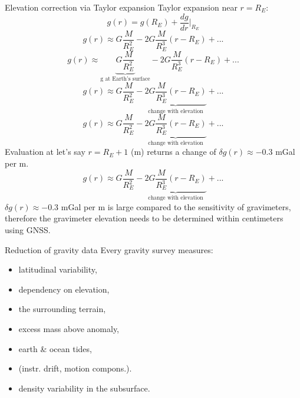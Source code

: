 \begin{frame}
  \begin{PointSix}{Elevation correction via Taylor expansion}
    Taylor expansion near $r=R_E$:
    {
      $$
        g(r) = g(R_E) + \frac{dg}{dr}|_{R_E}
      $$
    }
    {
      $$
        g(r) \approx G\frac{M}{R_E^2} - 2G\frac{M}{R_E^3}(r-R_E) + ...
      $$
    }
    {
      $$
        g(r) \approx \underbrace{G\frac{M}{R_E^2}}_{\text{g at Earth's surface}} - 2G\frac{M}{R_E^3}(r-R_E) + ...
      $$
    }
    {
      $$
        g(r) \approx G\frac{M}{R_E^2} - \underbrace{2G\frac{M}{R_E^3}(r-R_E)}_{\text{change with elevation}} + ...
      $$
    }
    {
      $$
        g(r) \approx G\frac{M}{R_E^2} - \underbrace{2G\frac{M}{R_E^3}(r-R_E)}_{\text{change with elevation}} + ...
      $$
      Evaluation at let's say $r=R_E+1$ (m) returns a change of $\delta g(r)\approx -0.3$ mGal per m.
    }
    {
      $$
        g(r) \approx G\frac{M}{R_E^2} - \underbrace{2G\frac{M}{R_E^3}(r-R_E)}_{\text{change with elevation}} + ...
      $$
      $\delta g(r)\approx -0.3$ mGal per m is large compared to the sensitivity of gravimeters, \alert{therefore the gravimeter elevation needs to be determined within centimeters using GNSS.}
    }
  \end{PointSix}
\end{frame}

\begin{frame}
  \begin{PointSix}{Reduction of gravity data}
    Every gravity survey measures:
    \begin{itemize}
      \item \textcolor{MyBlue}{latitudinal variability},
      \item \textcolor{MyBlue}{dependency on elevation},
      \item the surrounding terrain,
      \item excess mass above anomaly,
      \item earth \& ocean tides,
      \item (instr. drift, motion compons.).
      \item \alert{density variability in the subsurface.}
    \end{itemize}
  \end{PointSix}
\end{frame}

